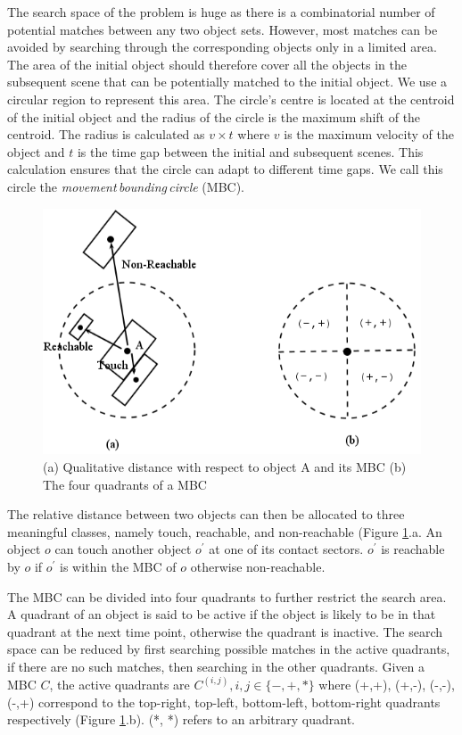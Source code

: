 \documentclass[letterpaper]{article}
\begin{document}
The search space of the problem is huge as there is a combinatorial number of potential matches between any two object sets. However, most matches can be avoided by searching through the corresponding objects only in a limited area. The area of the initial object should therefore cover all the objects in the subsequent scene that can be potentially matched to the initial object.  We use a circular region to represent this area. The circle's centre is located at the centroid of the initial object and the radius of the circle is the maximum shift of the centroid. The radius is calculated as $v \times t$ where $v$ is the maximum velocity of the object and $t$ is the time gap between the initial and subsequent scenes. This calculation ensures that the circle can adapt to different time gaps. We call this circle the \emph{movement\,bounding\,circle} (MBC).  
\begin{figure}[t]
\centering\includegraphics[scale=0.3]{quadrants.png}
\vspace{-3mm}
\caption{(a) Qualitative distance with respect to object A and its MBC (b)  The four quadrants of a MBC }
\label{Quadrants}
\vspace{-7mm}
\end{figure}

The relative distance between two objects can then be allocated to three meaningful classes, namely touch, reachable, and non-reachable (Figure \ref{Quadrants}.a. An object $o$ can touch another object $o^\prime$ at one of its contact sectors. $o^\prime$ is reachable by $o$ if $o^\prime$ is within the MBC of $o$ otherwise non-reachable. 

The MBC can be divided into four quadrants to further restrict the search area. A quadrant of an object is said to be active if the object is likely to be in that quadrant at the next time point, otherwise the quadrant is inactive. The search space can be reduced by first searching possible matches in the active quadrants, if there are no such matches, then searching in the other quadrants. Given a MBC $C$, the active quadrants are $C^{(i,j)}, i,j \in \{-, +, *\}$ where (+,+), (+,-), (-,-), (-,+) correspond to the top-right, top-left, bottom-left, bottom-right quadrants respectively (Figure \ref{Quadrants}.b). (*, *) refers to an arbitrary quadrant. 
\end{document}
